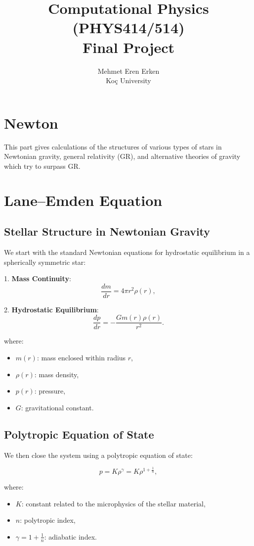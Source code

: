\documentclass[12pt]{article}
\title{Computational Physics (PHYS414/514) \\
Final Project}
\author{Mehmet Eren Erken \\
Koç University}
\date{}
\begin{document}
\maketitle

\clearpage %

\section*{Newton}

This part gives calculations of the structures of various types of stars in Newtonian gravity, general relativity (GR), and alternative theories of gravity which try to surpass GR.

\section{Lane–Emden Equation}

\subsection{Stellar Structure in Newtonian Gravity}

We start with the standard Newtonian equations for hydrostatic equilibrium in a spherically symmetric star:

1. \textbf{Mass Continuity}:
   \[
   \frac{dm}{dr} = 4\pi r^2 \rho(r),
   \]

2. \textbf{Hydrostatic Equilibrium}:
   \[
   \frac{dp}{dr} = -\frac{G m(r) \rho(r)}{r^2}.
   \]

where:
\begin{itemize}
    \item \( m(r) \): mass enclosed within radius \( r \),
    \item \( \rho(r) \): mass density,
    \item \( p(r) \): pressure,
    \item \( G \): gravitational constant.
\end{itemize}

\subsection{Polytropic Equation of State}

We then close the system using a polytropic equation of state:

\[
p = K \rho^\gamma = K \rho^{1 + \tfrac{1}{n}},
\]

where:
\begin{itemize}
    \item \( K \): constant related to the microphysics of the stellar material,
    \item \( n \): polytropic index,
    \item \(\gamma = 1 + \frac{1}{n}\): adiabatic index.
\end{itemize}
\end{document}
